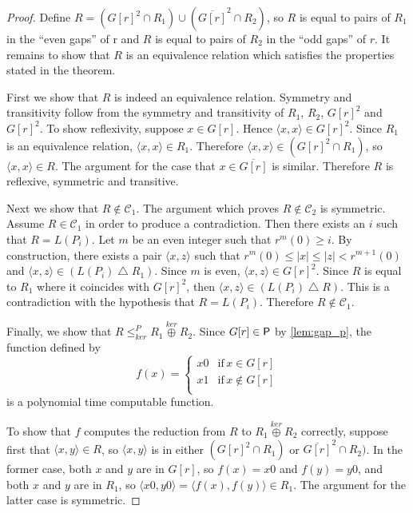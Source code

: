 \documentclass{article}
\theoremstyle{definition} \newtheorem{definition}[definition]{Definition}
\newcommand{\kj}{\overset{ker}{\oplus}} %
\newcommand{\kr}{\leq^{P}_{ker}} %
\newcommand{\symdiff}{\bigtriangleup} %
\newcommand{\pair}[2]{\langle#1,#2\rangle} %
\begin{document}
\begin{proof}
  Define $R=({G[r]}^2\cap R_1)\cup(\overline{G[r]}^2\cap R_2)$, so $R$ is equal to pairs of $R_1$ in the ``even gaps'' of r and $R$ is equal to pairs of $R_2$ in the ``odd gaps'' of $r$.
  It remains to show that $R$ is an equivalence relation which satisfies the properties stated in the theorem.

  First we show that $R$ is indeed an equivalence relation.
  Symmetry and transitivity follow from the symmetry and transitivity of $R_1$, $R_2$, ${G[r]}^2$ and ${G[r]}^2$.
  To show reflexivity, suppose $x\in G[r]$.
  Hence $\pair{x}{x}\in {G[r]}^2$.
  Since $R_1$ is an equivalence relation, $\pair{x}{x}\in R_1$.
  Therefore $\pair{x}{x}\in({G[r]}^2\cap R_1)$, so $\pair{x}{x}\in R$.
  The argument for the case that $x\in\overline{G[r]}$ is similar.
  Therefore $R$ is reflexive, symmetric and transitive.

  Next we show that $R\notin\mathcal{C}_1$.
  The argument which proves $R\notin\mathcal{C}_2$ is symmetric.
  Assume $R\in\mathcal{C}_1$ in order to produce a contradiction.
  Then there exists an $i$ such that $R=L(P_i)$.
  Let $m$ be an even integer such that $r^m(0)\geq i$.
  By construction, there exists a pair $\pair{x}{z}$ such that $r^m(0)\leq|x|\leq|z|<r^{m+1}(0)$ and $\pair{x}{z}\in(L(P_i)\symdiff R_1)$.
  Since $m$ is even, $\pair{x}{z}\in {G[r]}^2$.
  Since $R$ is equal to $R_1$ where it coincides with ${G[r]}^2$, then $\pair{x}{z}\in(L(P_i)\symdiff R)$.
  This is a contradiction with the hypothesis that $R=L(P_i)$.
  Therefore $R\notin\mathcal{C}_1$.

  Finally, we show that $R\kr R_1\kj R_2$.
  Since $G[r]\in\P$ by \autoref{lem:gap_p}, the function defined by
  \begin{displaymath}
    f(x)=
    \begin{cases}
      x0 & \text{if}\, x\in G[r]\\
      x1 & \text{if}\, x\notin G[r]\\
    \end{cases}
  \end{displaymath}
  is a polynomial time computable function.
  
  To show that $f$ computes the reduction from $R$ to $R_1\kj R_2$ correctly, suppose first that $\pair{x}{y}\in R$, so $\pair{x}{y}$ is in either $({G[r]}^2\cap R_1)$ or $\overline{G[r]}^2\cap R_2)$.
  In the former case, both $x$ and $y$ are in $G[r]$, so $f(x)=x0$ and $f(y)=y0$, and both $x$ and $y$ are in $R_1$, so $\pair{x0}{y0}=\pair{f(x)}{f(y)}\in R_1$.
  The argument for the latter case is symmetric.


\end{proof}
\end{document}
